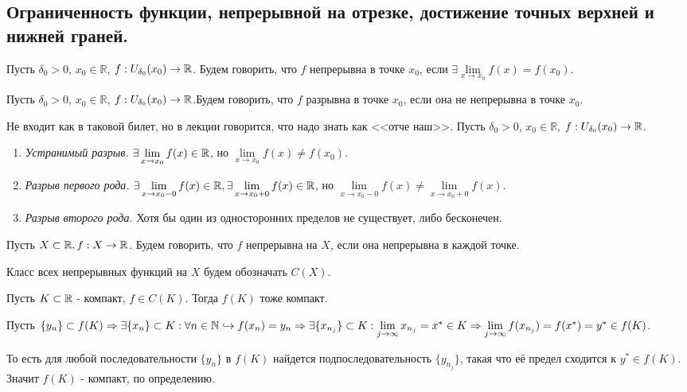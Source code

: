 \subsection{Ограниченность функции, непрерывной на отрезке, достижение точных верхней и нижней граней.}

\Def Пусть $\delta_0 > 0$, $x_0 \in \mathbb{R}$, $f: U_{\delta_0} (x_0) \to \mathbb{R}$. Будем говорить, что $f$ непрерывна в точке $x_0$, если $\exists \lim\limits_{x \to x_0} f(x) = f(x_0)$.

\Def Пусть $\delta_0 > 0$, $x_0 \in \mathbb{R}$, $f: U_{\delta_0} (x_0) \to \mathbb{R}$.Будем говорить, что $f$ разрывна в точке $x_0$, если она не непрерывна в точке $x_0$.

\Note Не входит как в таковой билет, но в лекции говорится, что надо знать как <<отче наш>>. Пусть $\delta_0 > 0$, $x_0 \in \mathbb{R}$, $f: U_{\delta_0} (x_0) \to \mathbb{R}$.
\begin{enumerate}
    \item \textit{Устранимый разрыв.} $\exists \lim\limits_{x \to x_0} f(x) \in \mathbb{R}$, но $\lim\limits_{x \to x_0} f(x) \neq f(x_0)$.
    \item \textit{Разрыв первого рода.} $\exists \lim\limits_{x \to x_0 - 0} f(x) \in \mathbb{R}, \exists \lim\limits_{x \to x_0 + 0} f(x) \in \mathbb{R}$, но $\lim\limits_{x \to x_0 - 0} f(x) \neq \lim\limits_{x \to x_0 + 0} f(x)$.
    \item \textit{Разрыв второго рода.} Хотя бы один из односторонних пределов не существует, либо бесконечен.
\end{enumerate}

\Def Пусть $X \subset \mathbb{R}, f: X \to \mathbb{R}$. Будем говорить, что $f$ непрерывна на $X$, если она непрерывна в каждой точке.

\Def Класс всех непрерывных функций на $X$ будем обозначать $C(X)$.

\Th Пусть $K \subset \mathbb{R}$ - компакт, $f \in C(K)$. Тогда $f(K)$ тоже компакт.

\Proof

Пусть $\{y_n\} \subset f(K) \Rightarrow \exists \{x_n\} \subset K: \forall n \in \mathbb{N} \hookrightarrow f(x_n) = y_n \Rightarrow \exists \{x_{n_j}\} \subset K: \lim\limits_{j \to \infty} x_{n_j} = x^* \in K \Rightarrow \lim\limits_{j \to \infty} f(x_{n_j}) = f(x^*) = y^* \in f(K)$.

То есть для любой последовательности $\{y_n\}$ в $f(K)$ найдется подпоследовательность $\{y_{n_j}\}$, такая что её предел сходится к $y^* \in f(K)$. Значит $f(K)$ - компакт, по определению.

\Endproof
